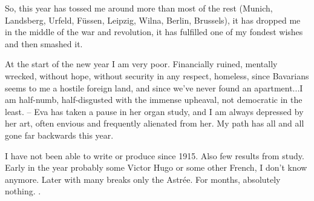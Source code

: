 So, this year has tossed me around more than most of the rest (Munich, Landsberg, Urfeld, Füssen, Leipzig, Wilna, Berlin, Brussels), it has dropped me in the middle of the war and revolution, it has fulfilled one of my fondest wishes  and then smashed it.

At the start of the new year I am very poor. Financially ruined, mentally wrecked, without hope, without security in any respect, homeless, since Bavarians seems to me a hostile foreign land, and since we've never found an apartment...I am half-numb, half-disgusted with the immense upheaval, not democratic in the least. -- Eva has taken a pause in her organ study, and I am always depressed by her art, often envious and frequently alienated from her. My path has all and all gone far backwards this year.

I have not been able to write or produce since 1915. Also few results from study. Early in the year probably some Victor Hugo or some other French, I don't know anymore. Later with many breaks only the Astrée. For months, absolutely nothing. .
